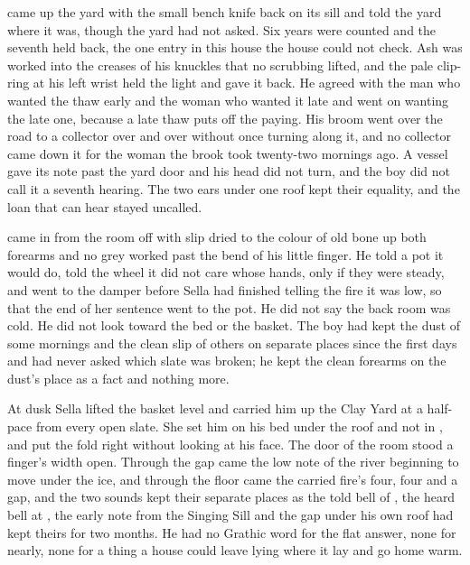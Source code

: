  came up the yard with the small bench knife back on its sill and told the yard where it was, though the yard had not asked. Six years were counted and the seventh held back, the one entry in this house the house could not check. Ash was worked into the creases of his knuckles that no scrubbing lifted, and the pale clip-ring at his left wrist held the light and gave it back. He agreed with the man who wanted the thaw early and the woman who wanted it late and went on wanting the late one, because a late thaw puts off the paying. His broom went over the road to a collector over and over without once turning along it, and no collector came down it for the woman the brook took twenty-two mornings ago. A vessel gave its note past the yard door and his head did not turn, and the boy did not call it a seventh hearing. The two ears under one roof kept their equality, and the loan that can hear stayed uncalled.

 came in from the room off  with slip dried to the colour of old bone up both forearms and no grey worked past the bend of his little finger. He told a pot it would do, told the wheel it did not care whose hands, only if they were steady, and went to the damper before Sella had finished telling the fire it was low, so that the end of her sentence went to the pot. He did not say the back room was cold. He did not look toward the bed or the basket. The boy had kept the dust of some mornings and the clean slip of others on separate places since the first days and had never asked which slate was broken; he kept the clean forearms on the dust's place as a fact and nothing more.

\scenebreak

At dusk Sella lifted the basket level and carried him up the Clay Yard at a half-pace from every open slate. She set him on his bed under the roof and not in , and put the fold right without looking at his face. The door of the room stood a finger's width open. Through the gap came the low note of the river beginning to move under the ice, and through the floor came the carried fire's four, four and a gap, and the two sounds kept their separate places as the told bell of , the heard bell at , the early note from the Singing Sill and the gap under his own roof had kept theirs for two months. He had no Grathic word for the flat answer, none for nearly, none for a thing a house could leave lying where it lay and go home warm.

